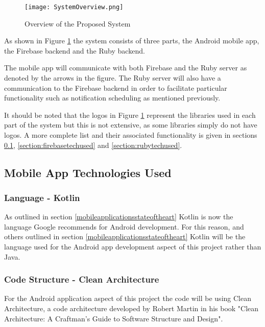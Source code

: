 \begin{figure}[ht]
  \centering
      \texttt{[image: SystemOverview.png]}
  \caption[Overview of the Proposed System]{Overview of the Proposed System}
  \label{fig:systemoverview}
\end{figure}

As shown in Figure \ref{fig:systemoverview} the system consists of three parts, the Android mobile app, the Firebase backend and the Ruby backend.

The mobile app will communicate with both Firebase and the Ruby server as denoted by the arrows in the figure. The Ruby server will also have a communication to the Firebase backend in order to facilitate particular functionality such as notification scheduling as mentioned previously. 

It should be noted that the logos in Figure \ref{fig:systemoverview} represent the libraries used in each part of the system but this is not extensive, as some libraries simply do not have logos. A more complete list and their associated functionality is given in sections \ref{section:mobiletechused}, \ref{section:firebasetechused} and \ref{section:rubytechused}.

\subsection{Mobile App Technologies Used}
\label{section:mobiletechused}

\subsubsection{Language - Kotlin}
\label{arch:kotlin}

As outlined in section \ref{mobileapplicationsstateoftheart} Kotlin is now the language Google recommends for Android development. For this reason, and others outlined in section \ref{mobileapplicationsstateoftheart} Kotlin will be the language used for the Android app development aspect of this project rather than Java.

\subsubsection{Code Structure - Clean Architecture}
\label{section:cleanarch}

For the Android application aspect of this project the code will be using Clean Architecture, a code architecture developed by Robert Martin in his book "Clean Architecture: A Craftman's Guide to Software Structure and Design"\cite{cleanarchitecturebook}.

